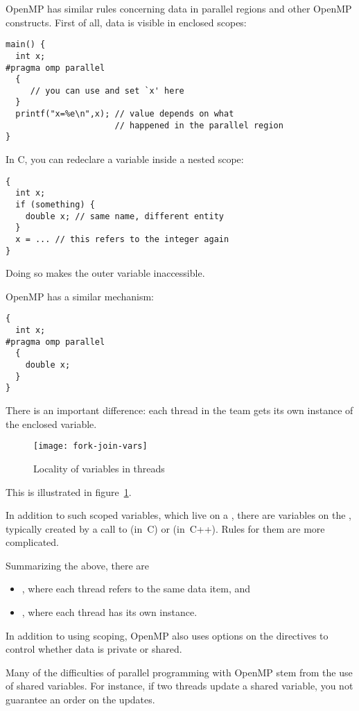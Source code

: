 OpenMP has similar rules concerning data in parallel regions
and other OpenMP constructs. First of all, data is visible
in enclosed scopes:
\begin{verbatim}
main() {
  int x;
#pragma omp parallel
  {
     // you can use and set `x' here
  }
  printf("x=%e\n",x); // value depends on what
                      // happened in the parallel region
}
\end{verbatim}

In C, you can redeclare a variable inside a nested scope:
\begin{verbatim}
{
  int x;
  if (something) {
    double x; // same name, different entity
  }
  x = ... // this refers to the integer again
}
\end{verbatim}
Doing so makes the outer variable inaccessible.

OpenMP has a similar mechanism:
\begin{verbatim}
{
  int x;
#pragma omp parallel
  {
    double x;
  }
}
\end{verbatim}
There is an important difference: each thread in the team
gets its own instance of the enclosed variable.

\begin{figure}[ht]
\texttt{[image: fork-join-vars]}
\caption{Locality of variables in threads}
\label{fig:threadvars}
\end{figure}
%
This is illustrated in figure~\ref{fig:threadvars}.

In addition to such scoped variables, which live on a ,
there are variables on the
, typically created by a call to 
(in~C) or  (in~C++). Rules for them are more complicated.

Summarizing the above, there are
\begin{itemize}
\item {},
  where each thread refers to the same data item, and 
\item {},
  where each thread has its own instance.
\end{itemize}
In addition to using scoping, OpenMP also uses options on the directives
to control whether data is private or shared.

Many of the difficulties of parallel programming with OpenMP stem
from the use of shared variables. For instance, if two threads
update a shared variable, you not guarantee an order on the updates.

